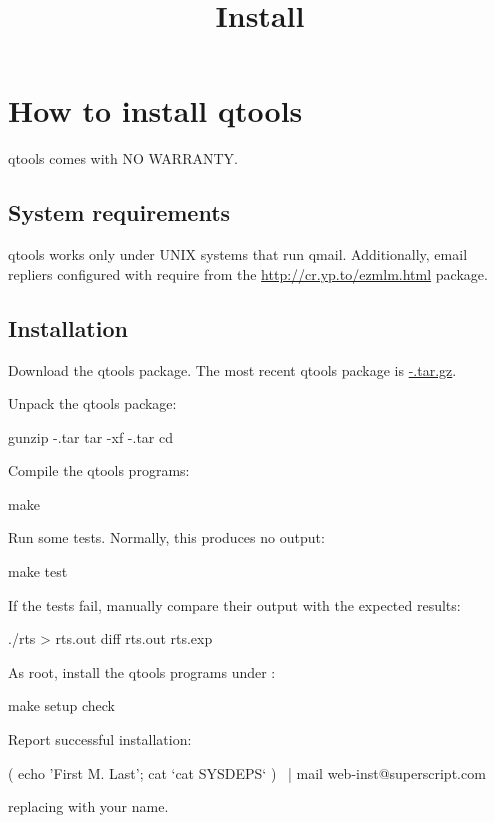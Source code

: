 \documentclass{book}
\title{Install}
\begin{document}
\section{How to install qtools}

qtools comes with NO WARRANTY.

\subsection{System requirements}
qtools works only under UNIX systems that run qmail.  Additionally,
email repliers configured with  require
 from the \href{ezmlm}{http://cr.yp.to/ezmlm.html}
package.

\subsection{Installation}

Download the qtools package.  The most recent qtools package is
\href{\version}{\package-\version.tar.gz}.

Unpack the qtools package:
\begin{code}%
  gunzip \package-\version.tar
  tar -xf \package-\version.tar
  cd \package
\end{code}

Compile the qtools programs:
\begin{code}%
  make
\end{code}

Run some tests.  Normally, this produces no output:
\begin{code}%
  make test
\end{code}
If the tests fail, manually compare their output with the expected results:
\begin{code}%
  ./rts \string> rts.out
  diff rts.out rts.exp
\end{code}

As root, install the qtools programs under :
\begin{code}%
  make setup check
\end{code}

Report successful installation:
\begin{code}%
  ( echo 'First M. Last'; cat `cat SYSDEPS` ) \
  | mail web-inst@superscript.com
\end{code}
replacing  with your name.
\end{document}
